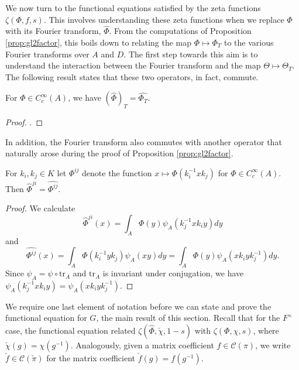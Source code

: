 We now turn to the functional equations satisfied by the zeta functions $\zeta(\Phi,f,s)$. This involves understanding these zeta functions when we replace $\Phi$ with its Fourier transform, $\hat{\Phi}$. From the computations of Proposition \ref{prop:gl2factor}, this boils down to relating the map $\Phi \mapsto \Phi_T$ to the various Fourier transforms over $A$ and $D$. The first step towards this aim is to understand the interaction between the Fourier transform and the map $\Theta\mapsto\Theta_T$. The following result states that these two operators, in fact, commute.

\begin{lemma}
    For $\Phi \in C_c^\infty(A)$, we have $(\hat{\Phi})_T = \widehat{\Phi_T}$.
\end{lemma}
\begin{proof}
    \cite[Lemma 26.3]{BH1}.
\end{proof}

In addition, the Fourier transform also commutes with another operator that naturally arose during the proof of Proposition \ref{prop:gl2factor}.

\begin{lemma}\label{hat}
    For $k_i,k_j \in K$ let $\Phi^{ij}$ denote the function $x \mapsto \Phi(k_i^{-1}xk_j)$ for $\Phi \in C_c^\infty(A)$. Then $\hat\Phi^{ji} = \widehat{\Phi^{ij}}$. 
\end{lemma}
\begin{proof}
    We calculate 
    $$\hat\Phi^{ji}(x) = \int_A \Phi(y)\psi_A(k_j^{-1}xk_iy)dy$$
    and 
    $$\widehat{\Phi^{ij}}(x) = \int_A\Phi(k_i^{-1}yk_j)\psi_A(xy)dy = \int_A \Phi(y)\psi_A(xk_iyk_j^{-1})dy.$$
    Since $\psi_A = \psi \circ \mathrm{tr}_A$ and $\mathrm{tr}_A$ is invariant under conjugation, we have $\psi_A(k_j^{-1}xk_iy) = \psi_A(xk_iyk_j^{-1})$.
\end{proof}

We require one last element of notation before we can state and prove the functional equation for $G$, the main result of this section. Recall that for the $F^\times$ case, the functional equation related $\zeta(\hat{\Phi},\check{\chi},1-s)$ with $\zeta(\Phi,\chi,s)$, where $\check{\chi}(g)=\chi(g^{-1})$. Analogously, given a matrix coefficient $f\in\mathcal{C}(\pi)$, we write $\check{f} \in \mathcal C(\check\pi)$ for the matrix coefficient $\check{f}(g) = f(g^{-1})$.

